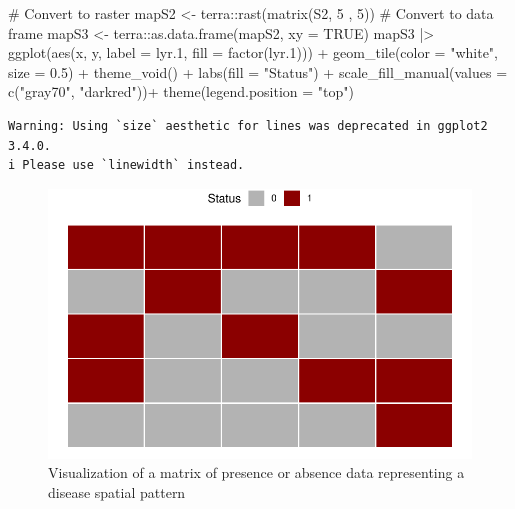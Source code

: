 \documentclass[
  letterpaper,
  DIV=11,
  numbers=noendperiod]{scrreprt}
\newenvironment{Shaded}{\begin{snugshade}}{\end{snugshade}}
\newcommand{\AttributeTok}[1]{\textcolor[rgb]{0.40,0.45,0.13}{#1}}
\newcommand{\CommentTok}[1]{\textcolor[rgb]{0.37,0.37,0.37}{#1}}
\newcommand{\ConstantTok}[1]{\textcolor[rgb]{0.56,0.35,0.01}{#1}}
\newcommand{\DecValTok}[1]{\textcolor[rgb]{0.68,0.00,0.00}{#1}}
\newcommand{\FloatTok}[1]{\textcolor[rgb]{0.68,0.00,0.00}{#1}}
\newcommand{\FunctionTok}[1]{\textcolor[rgb]{0.28,0.35,0.67}{#1}}
\newcommand{\NormalTok}[1]{\textcolor[rgb]{0.00,0.23,0.31}{#1}}
\newcommand{\OtherTok}[1]{\textcolor[rgb]{0.00,0.23,0.31}{#1}}
\newcommand{\SpecialCharTok}[1]{\textcolor[rgb]{0.37,0.37,0.37}{#1}}
\newcommand{\StringTok}[1]{\textcolor[rgb]{0.13,0.47,0.30}{#1}}
\begin{document}
\begin{Shaded}
\begin{Highlighting}[]
\CommentTok{\# Convert to raster }
\NormalTok{mapS2 }\OtherTok{\textless{}{-}}\NormalTok{ terra}\SpecialCharTok{::}\FunctionTok{rast}\NormalTok{(}\FunctionTok{matrix}\NormalTok{(S2, }\DecValTok{5}\NormalTok{ , }\DecValTok{5}\NormalTok{))}
\CommentTok{\# Convert to data frame}
\NormalTok{mapS3 }\OtherTok{\textless{}{-}}\NormalTok{ terra}\SpecialCharTok{::}\FunctionTok{as.data.frame}\NormalTok{(mapS2, }\AttributeTok{xy =} \ConstantTok{TRUE}\NormalTok{)}
\NormalTok{mapS3 }\SpecialCharTok{|\textgreater{}}
  \FunctionTok{ggplot}\NormalTok{(}\FunctionTok{aes}\NormalTok{(x, y, }\AttributeTok{label =}\NormalTok{ lyr}\FloatTok{.1}\NormalTok{, }\AttributeTok{fill =} \FunctionTok{factor}\NormalTok{(lyr}\FloatTok{.1}\NormalTok{))) }\SpecialCharTok{+}
  \FunctionTok{geom\_tile}\NormalTok{(}\AttributeTok{color =} \StringTok{"white"}\NormalTok{, }\AttributeTok{size =} \FloatTok{0.5}\NormalTok{) }\SpecialCharTok{+}
  \FunctionTok{theme\_void}\NormalTok{() }\SpecialCharTok{+}
  \FunctionTok{labs}\NormalTok{(}\AttributeTok{fill =} \StringTok{"Status"}\NormalTok{) }\SpecialCharTok{+}
  \FunctionTok{scale\_fill\_manual}\NormalTok{(}\AttributeTok{values =} \FunctionTok{c}\NormalTok{(}\StringTok{"gray70"}\NormalTok{, }\StringTok{"darkred"}\NormalTok{))}\SpecialCharTok{+}
  \FunctionTok{theme}\NormalTok{(}\AttributeTok{legend.position =} \StringTok{"top"}\NormalTok{)}
\end{Highlighting}
\end{Shaded}

\begin{verbatim}
Warning: Using `size` aesthetic for lines was deprecated in ggplot2 3.4.0.
i Please use `linewidth` instead.
\end{verbatim}

\begin{figure}[H]

{\centering \includegraphics{spatial-tests_files/figure-pdf/fig-joincount1-1.pdf}

}

\caption{\label{fig-joincount1}Visualization of a matrix of presence or
absence data representing a disease spatial pattern}

\end{figure}
\end{document}
